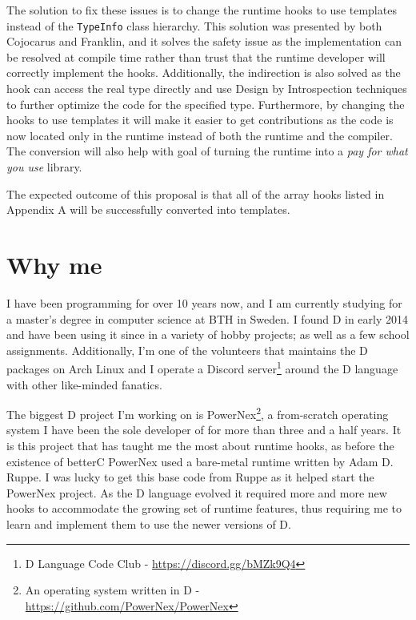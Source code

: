 \documentclass[10pt,a4paper]{article}
\begin{document}
The solution to fix these issues is to change the runtime hooks to use templates 
instead of the \texttt{TypeInfo} class hierarchy. This solution was 
presented by both Cojocarus and Franklin, and it solves the safety issue as the 
implementation can be resolved at compile time rather than trust that the 
runtime developer will correctly implement the hooks. Additionally, the 
indirection is also solved as the hook can access the real type directly and use 
Design by Introspection techniques to further optimize the code for the 
specified type. Furthermore, by changing the hooks to use templates it will make 
it easier to get contributions as the code is now located only in the runtime 
instead of both the runtime and the compiler\cite[at 00:04:45]{GenericLightweightRuntime}. The conversion will also help with 
goal of turning the runtime into a \textit{pay for what you use} library.

The expected outcome of this proposal is that all of the array hooks listed in 
Appendix A will be successfully converted into templates.

\section{Why me}
I have been programming for over 10 years now, and I am currently studying for a 
master’s degree in computer science at BTH in Sweden. I found D in early 2014 
and have been using it since in a variety of hobby projects; as well as a few 
school assignments. Additionally, I’m one of the volunteers that maintains the D 
packages on Arch Linux\cite{TrustedUsers} and I operate a Discord server\footnote{D Language Code Club - \url{https://discord.gg/bMZk9Q4}} around the D language with 
other like-minded fanatics.

The biggest D project I’m working on is PowerNex\footnote{An operating system written in D - \url{https://github.com/PowerNex/PowerNex}}, a from-scratch operating 
system I have been the sole developer of for more than three and a half years. 
It is this project that has taught me the most about runtime hooks, as before 
the existence of betterC PowerNex used a bare-metal runtime written by Adam D. 
Ruppe\cite{MinimalZip}. I was lucky to get this base code from Ruppe as it helped start the 
PowerNex project. As the D language evolved it required more and more new hooks 
to accommodate the growing set of runtime features, thus requiring me to learn 
and implement them to use the newer versions of D.
\end{document}

